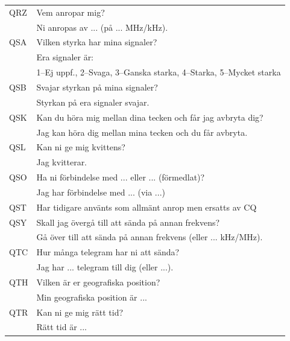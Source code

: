 \begin{longtable}{ll}
	QRZ          & Vem anropar mig?                                                     \\
                     & Ni anropas av ... (på ... MHz/kHz).                                  \\ \hline
	QSA          & Vilken styrka har mina signaler?                                     \\
                     & Era signaler är:                                                     \\
                     & 1--Ej uppf., 2--Svaga, 3--Ganska starka, 4--Starka, 5--Mycket starka \\ \hline
	QSB          & Svajar styrkan på mina signaler?                                     \\
                     & Styrkan på era signaler svajar.                                      \\ \hline
	QSK          & Kan du höra mig mellan dina tecken och får jag avbryta dig?          \\
                     & Jag kan höra dig mellan mina tecken och du får avbryta.              \\ \hline
	QSL          & Kan ni ge mig kvittens?                                              \\
                     & Jag kvitterar.                                                       \\ \hline
	QSO          & Ha ni förbindelse med ... eller ... (förmedlat)?                     \\
                     & Jag har förbindelse med ... (via ...)                                \\ \hline
	QST          & Har tidigare använts som allmänt anrop men ersatts av CQ             \\ \hline
	QSY          & Skall jag övergå till att sända på annan frekvens?                   \\
                     & Gå över till att sända på annan frekvens (eller ... kHz/MHz).        \\ \hline
	QTC          & Hur många telegram har ni att sända?                                 \\
                     & Jag har ... telegram till dig (eller ...).                           \\ \hline
	QTH          & Vilken är er geografiska position?                                   \\
                     & Min geografiska position är ...                                      \\ \hline
	QTR          & Kan ni ge mig rätt tid?                                              \\
                     & Rätt tid är ...                                                      \\
\end{longtable}